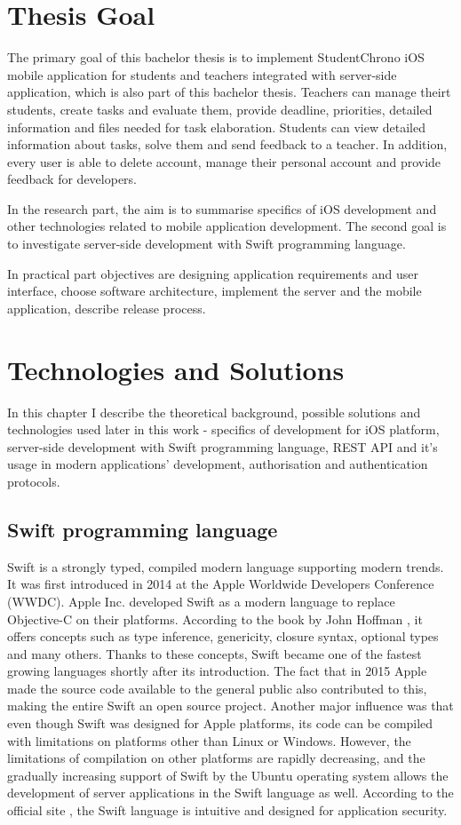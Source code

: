 \documentclass[
  language=english,
  figures=false,
  sourcecodes,
  index
]{kidiplom}
\begin{document}
\section{Thesis Goal}
The primary goal of this bachelor thesis is to implement StudentChrono iOS mobile application for students and teachers integrated with server-side application, which is also part of this bachelor thesis. Teachers can manage theirt students, create tasks and evaluate them, provide deadline, priorities, detailed information and files needed for task elaboration. Students can view detailed information about tasks, solve them and send feedback to a teacher. In addition, every user is able to delete account, manage their personal account and provide feedback for developers.

In the research part, the aim is to summarise specifics of iOS development and other technologies related to mobile application development. The second goal is to investigate server-side development with Swift programming language.

In practical part objectives are designing application requirements and user interface, choose software architecture, implement the server and the mobile application, describe release process.

\section{Technologies and Solutions}

In this chapter I describe the theoretical background, possible solutions and technologies used later in this work - specifics of development for iOS platform, server-side development with Swift programming language, REST API and it's usage in modern applications' development, authorisation and authentication protocols.

\subsection{Swift programming language}
Swift is a strongly typed, compiled modern language supporting modern trends. It was first introduced in 2014 at the Apple Worldwide Developers Conference (WWDC). Apple Inc. developed Swift as a modern language to replace Objective-C on their platforms. According to the book by John Hoffman \cite{bib2}, it offers concepts such as type inference, genericity, closure syntax, optional types and many others. Thanks to these concepts, Swift became one of the fastest growing languages shortly after its introduction. The fact that in 2015 Apple made the source code available to the general public also contributed to this, making the entire Swift an open source project. Another major influence was that even though Swift was designed for Apple platforms, its code can be compiled with limitations on platforms other than Linux or Windows. However, the limitations of compilation on other platforms are rapidly decreasing, and the gradually increasing support of Swift by the Ubuntu operating system allows the development of server applications in the Swift language as well. According to the official site \cite{bib3}, the Swift language is intuitive and designed for application security.
\end{document}
